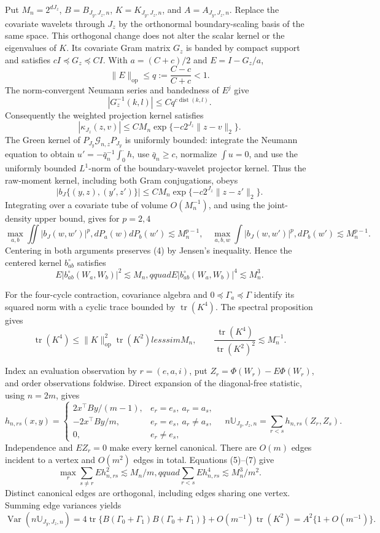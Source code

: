 Put \(M_n=2^{dJ_z}\), \(B=B_{J_y,J_z,n}\), \(K=K_{J_y,J_z,n}\), and \(A=A_{J_y,J_z,n}\).  Replace the covariate wavelets through \(J_z\) by the orthonormal boundary-scaling basis of the same space.  This orthogonal change does not alter the scalar kernel or the eigenvalues of \(K\).  Its covariate Gram matrix \(G_z\) is banded by compact support and satisfies \(cI\preceq G_z\preceq CI\).  With \(a=(C+c)/2\) and \(E=I-G_z/a\),
\[
\|E\|_{\mathrm{op}}\le q:=\frac{C-c}{C+c}<1.
\]
The norm-convergent Neumann series and bandedness of \(E^j\) give
\[
|G_z^{-1}(k,l)|\le Cq^{c\operatorname{dist}(k,l)}. \tag{1}
\]
Consequently the weighted projection kernel satisfies
\[
|\kappa_{J_z}(z,v)|\le CM_n\exp\{-c2^{J_z}\|z-v\|_2\}. \tag{2}
\]
The Green kernel of \(P_{J_y}\mathcal G_{n,z}P_{J_y}\) is uniformly bounded: integrate the Neumann equation to obtain \(u'=-\bar q_n^{-1}\int_0^\cdot h\), use \(\bar q_n\ge c\), normalize \(\int u=0\), and use the uniformly bounded \(L^1\)-norm of the boundary-wavelet projector kernel.  Thus the raw-moment kernel, including both Gram conjugations, obeys
\[
|b_J\{(y,z),(y',z')\}|
\le CM_n\exp\{-c2^{J_z}\|z-z'\|_2\}. \tag{3}
\]
Integrating over a covariate tube of volume \(O(M_n^{-1})\), and using the joint-density upper bound, gives for \(p=2,4\)
\[
\max_{a,b}\iint|b_J(w,w')|^p,dP_a(w)dP_b(w')\lesssim M_n^{p-1},
\quad
\max_{a,b,w}\int|b_J(w,w')|^p,dP_b(w')\lesssim M_n^{p-1}. \tag{4}
\]
Centering in both arguments preserves (4) by Jensen's inequality.  Hence the centered kernel \(b_{ab}^{\circ}\) satisfies
\[
E|b_{ab}^{\circ}(W_a,W_b)|^2\lesssim M_n,qquad
E|b_{ab}^{\circ}(W_a,W_b)|^4\lesssim M_n^3. \tag{5}
\]

For the four-cycle contraction, covariance algebra and \(0\preceq\Gamma_a\preceq\Gamma\) identify its squared norm with a cyclic trace bounded by \(\operatorname{tr}(K^4)\).  The spectral proposition gives
\[
\operatorname{tr}(K^4)\le\|K\|_{\mathrm{op}}^2\operatorname{tr}(K^2)lesssim M_n,
\qquad
\frac{\operatorname{tr}(K^4)}{\operatorname{tr}(K^2)^2}\lesssim M_n^{-1}. \tag{6}
\]

Index an evaluation observation by \(r=(e,a,i)\), put \(Z_r=\Phi(W_r)-E\Phi(W_r)\), and order observations foldwise.  Direct expansion of the diagonal-free statistic, using \(n=2m\), gives
\[
h_{n,rs}(x,y)=
\begin{cases}
2x^\top By/(m-1),&e_r=e_s,\ a_r=a_s,\\
-2x^\top By/m,&e_r=e_s,\ a_r\ne a_s,\\
0,&e_r\ne e_s,
\end{cases}
\quad
n\mathbb U_{J_y,J_z,n}=\sum_{r<s}h_{n,rs}(Z_r,Z_s). \tag{7}
\]
Independence and \(EZ_r=0\) make every kernel canonical.  There are \(O(m)\) edges incident to a vertex and \(O(m^2)\) edges in total.  Equations (5)--(7) give
\[
\max_r\sum_{s\ne r}Eh_{n,rs}^2\lesssim M_n/m,qquad
\sum_{r<s}Eh_{n,rs}^4\lesssim M_n^3/m^2. \tag{8}
\]
Distinct canonical edges are orthogonal, including edges sharing one vertex.  Summing edge variances yields
\[
\operatorname{Var}(n\mathbb U_{J_y,J_z,n})
=4\operatorname{tr}\{B(\Gamma_0+\Gamma_1)B(\Gamma_0+\Gamma_1)\}
+O(m^{-1})\operatorname{tr}(K^2)
=A^2\{1+O(m^{-1})\}. \tag{9}
\]

